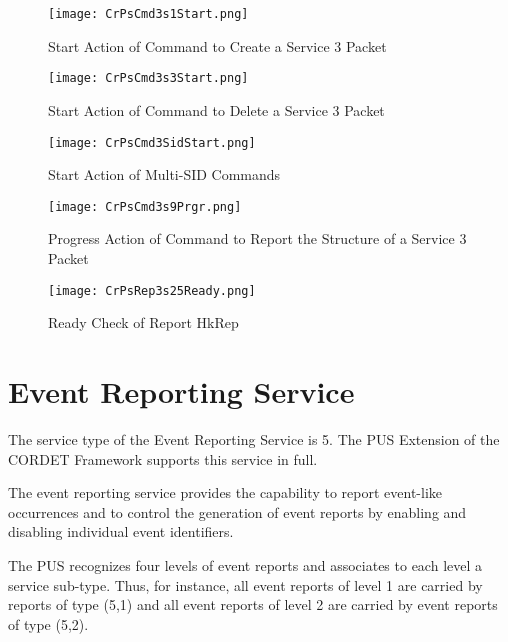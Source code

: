 \documentclass{pnp_article}
\begin{document}
\begin{figure}[H]
 \centering
 \texttt{[image: CrPsCmd3s1Start.png]}
 \caption{Start Action of Command to Create a Service 3 Packet}
 \label{fig:Cmd3s1Start}
\end{figure}

\begin{figure}[H]
 \centering
 \texttt{[image: CrPsCmd3s3Start.png]}
 \caption{Start Action of Command to Delete a Service 3 Packet}
 \label{fig:Cmd3s3Start}
\end{figure}

\begin{figure}[H]
 \centering
 \texttt{[image: CrPsCmd3SidStart.png]}
 \caption{Start Action of Multi-SID Commands}
 \label{fig:Cmd3SidStart}
\end{figure}

\begin{figure}[H]
 \centering
 \texttt{[image: CrPsCmd3s9Prgr.png]}
 \caption{Progress Action of Command to Report the Structure of a Service 3 Packet}
 \label{fig:Cmd3s9Prgr}
\end{figure}

\begin{figure}[H]
 \centering
 \texttt{[image: CrPsRep3s25Ready.png]}
 \caption{Ready Check of Report HkRep}
 \label{fig:Rep3s25Ready}
\end{figure}


\section{Event Reporting Service}\label{sec:serv5}
The service type of the Event Reporting Service is 5. The PUS Extension of the CORDET Framework supports this service in full.

The event reporting service provides the capability to report event-like occurrences and to control the generation of event reports by enabling and disabling individual event identifiers.

The PUS recognizes four levels of event reports and associates to each level a service sub-type. Thus, for instance, all event reports of level 1 are carried by reports of type (5,1) and all event reports of level 2 are carried by event reports of type (5,2). 
\end{document}
